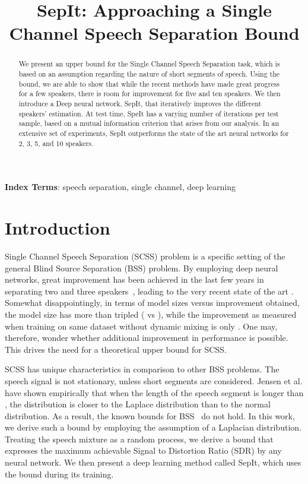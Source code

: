 \documentclass[a4paper]{article}
\title{SepIt: Approaching a Single Channel Speech Separation Bound}
\theoremstyle{plain}
\theoremstyle{definition}
\theoremstyle{remark}
\begin{document}
\maketitle
\begin{abstract}
We present an upper bound for the Single Channel Speech Separation task, which is based on an assumption regarding the nature of short segments of speech. Using the bound, we are able to show that while the recent methods have made great progress for a few speakers, there is room for improvement for five and ten speakers. We then introduce a Deep neural network, SepIt, that iteratively improves the different speakers' estimation. At test time, SpeIt has a varying number of iterations per test sample, based on a mutual information criterion that arises from our analysis. In an extensive set of experiments, SepIt outperforms the state of the art neural networks for 2, 3, 5, and 10 speakers.
\end{abstract}
\noindent\textbf{Index Terms}: speech separation, single channel, deep learning

\section{Introduction}
Single Channel Speech Separation (SCSS) problem is a specific setting of the general Blind Source Separation (BSS) problem. By employing deep neural networks, great improvement has been achieved in the last few years in separating two and three speakers~\cite{luo2020dualpath,nachmani2020voice}, leading to the very recent state of the art \cite{subakan2021attention}. Somewhat disappointingly, in terms of model sizes versus improvement obtained, the model size has more than tripled ( \cite{subakan2021attention} vs  \cite{nachmani2020voice}), while the improvement as measured when training on same dataset without dynamic mixing is only . One may, therefore, wonder whether additional improvement in performance is possible. This drives the need for a theoretical upper bound for SCSS. 

SCSS has unique characteristics in comparison to other BSS problems. The speech signal is not stationary, unless short segments are considered. Jensen et al. \cite{Jensen} have shown empirically that when the length of the speech segment is longer than , the distribution is closer to the Laplace distribution than to the normal distribution. As a result, the known bounds for BSS~\cite{4202618} do not hold. In this work, we derive such a bound by employing the assumption of a Laplacian distribution. Treating the speech mixture as a random process, we derive a bound that expresses the maximum achievable Signal to Distortion Ratio (SDR) by any neural network. We then present a deep learning method called SepIt, which uses the bound during its training. 
\end{document}
